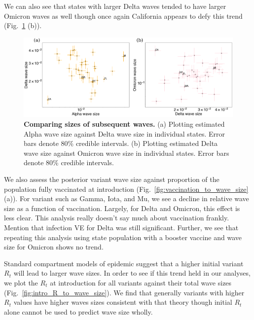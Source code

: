 \documentclass[11pt,oneside,letterpaper]{article}
\begin{document}
We can also see that states with larger Delta waves tended to have larger Omicron waves as well though once again California appears to defy this trend (Fig.\ \ref{fig:wave_size_to_wave_size} (b)).

\begin{figure}[t]
  \centering
  \includegraphics[width=\linewidth]{figs/wave_size_to_wave_size.png}
  \caption{\textbf{Comparing sizes of subsequent waves.}
    (a) Plotting estimated Alpha wave size against Delta wave size in individual states. Error bars denote 80\% credible intervals.
    (b) Plotting estimated Delta wave size against Omicron wave size in individual states. Error bars denote 80\% credible intervals.
  }
  \label{fig:wave_size_to_wave_size}
\end{figure}

We also assess the posterior variant wave size against proportion of the population fully vaccinated at introduction (Fig.\ \ref{fig:vaccination_to_wave_size} (a)).
For variant such as Gamma, Iota, and Mu, we see a decline in relative wave size as a function of vaccination. 
Largely, for Delta and Omicron, this effect is less clear.
This analysis really doesn't say much about vaccination frankly. Mention that infection VE for Delta was still significant.
Further, we see that repeating this analysis using state population with a booster vaccine and wave size for Omicron shows no trend.

Standard compartment models of epidemic suggest that a higher initial variant $R_{t}$ will lead to larger wave sizes. 
In order to see if this trend held in our analyses, we plot the $R_{t}$ at introduction for all variants against their total wave sizes (Fig.\ \ref{fig:intro_R_to_wave_size}).
We find that generally variants with higher $R_{t}$ values have higher waves sizes consistent with that theory though initial $R_{t}$ alone cannot be used to predict wave size wholly.
\end{document}
